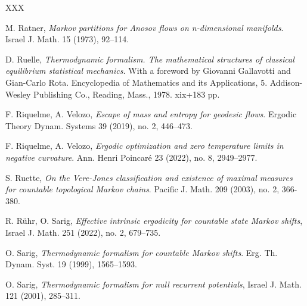 \documentclass[letterpaper,11pt]{amsart}
\theoremstyle{plain}
\theoremstyle{plain}
\theoremstyle{definition}
\theoremstyle{remark}
\begin{document}
\begin{thebibliography}{XXX}

 M. Ratner, \emph{Markov partitions for Anosov flows on n-dimensional manifolds}. Israel J. Math. 15 (1973), 92--114.

 D. Ruelle, \emph{Thermodynamic formalism. The mathematical structures of classical equilibrium statistical mechanics.} With a foreword by Giovanni Gallavotti and Gian-Carlo Rota. Encyclopedia of Mathematics and its Applications, 5. Addison-Wesley Publishing Co., Reading, Mass., 1978. xix+183 pp.



 F. Riquelme, A. Velozo, \emph{Escape of mass and entropy for geodesic flows}.  Ergodic Theory Dynam. Systems 39 (2019), no. 2, 446--473.

 F. Riquelme, A. Velozo, \emph{Ergodic optimization and zero temperature limits in negative curvature}. Ann. Henri Poincar\'e 23 (2022), no. 8, 2949--2977.

 S. Ruette, \emph{On the Vere-Jones classification and existence of maximal measures for countable topological Markov chains}. Pacific J. Math. 209 (2003), no. 2, 366-380.

  R. R\"uhr,  O. Sarig, \emph{Effective intrinsic ergodicity for countable state Markov shifts}, Israel J. Math. 251 (2022), no. 2, 679--735.



 O. Sarig, \emph{Thermodynamic formalism for countable Markov shifts}. Erg. Th. Dynam. Syst. 19 (1999), 1565--1593.

 O. Sarig, \emph{Thermodynamic formalism for null recurrent potentials}, Israel J. Math. 121 (2001), 285--311.


\end{thebibliography}
\end{document}
